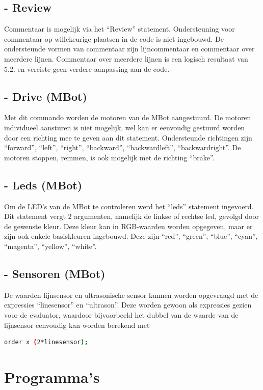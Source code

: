 \documentclass[12pt,a4paper]{report}
\begin{document}
\section{- Review}
Commentaar is mogelijk via het ``Review'' statement. Ondersteuning voor commentaar op willekeurige plaatsen in de code is niet ingebouwd. De ondersteunde vormen van commentaar zijn lijncommentaar en commentaar over meerdere lijnen. Commentaar over meerdere lijnen is een logisch resultaat van \textsc{5.2.} en vereiste geen verdere aanpassing aan de code.

\section{- Drive (MBot)}
Met dit commando worden de motoren van de MBot aangestuurd. De motoren individueel aansturen is niet mogelijk, wel kan er eenvoudig gestuurd worden door een richting mee te geven aan dit statement. Ondersteunde richtingen zijn ``forward'', ``left'', ``right'', ``backward'', ``backwardleft'', ``backwardright''. De motoren stoppen, remmen, is ook mogelijk met de richting ``brake''.

\section{- Leds (MBot)}
Om de LED's van de MBot te controleren werd het ``leds'' statement ingevoerd. Dit statement vergt 2 argumenten, namelijk de linkse of rechtse led, gevolgd door de gewenste kleur. Deze kleur kan in RGB-waarden worden opgegeven, maar er zijn ook enkele basiskleuren ingebouwd. Deze zijn ``red'', ``green'', ``blue'', ``cyan'', ``magenta'', ``yellow'', ``white''.

\section{- Sensoren (MBot)}
De waarden lijnsensor en ultrasonische sensor kunnen worden opgevraagd met de expressies ``linesensor'' en ``ultrason''. Deze worden gewoon als expressies gezien voor de evaluator, waardoor bijvoorbeeld het dubbel van de waarde van de lijnsensor eenvoudig kan worden berekend met
\begin{lstlisting}[language=Bash]
  order x (2*linesensor);
\end{lstlisting}

\chapter{Programma's}
\end{document}
